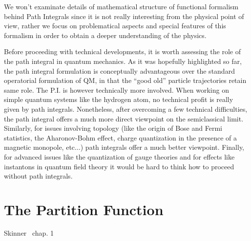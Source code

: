 \documentclass[../main/main.tex]{subfiles}
\begin{document}
We won't examinate details of mathematical structure of functional formalism behind Path Integrals since it is not really interesting from the physical point of view, rather we focus on problematical aspects and special features of this formalism in order to obtain a deeper understanding of the physics. 

Before proceeding with technical developments, it is worth assessing the role of the path integral in quantum mechanics. As it was hopefully highlighted so far, the path integral formulation is conceptually advantageous over the standard operatorial formulation of QM, in that the ``good old'' particle trajectories retain same role. The P.I. is however technically more involved. When working on simple quantum systems like the hydrogen atom, no technical profit is really given by path integrals. Nonetheless, after overcoming a few technical difficulties, the path integral offers a much more direct viewpoint on the semiclassical limit. Similarly, for issues involving topology (like the origin of Bose and Fermi statistics, the Aharonov-Bohm effect, charge quantization in the presence of a magnetic monopole, etc$\dots$) path integrals offer a much better viewpoint. Finally, for advanced issues like the quantization of gauge theories and for effects like instantons in quantum field theory it would be hard to think how to proceed without path integrals.

\section{The Partition Function}
\textsf{Skinner~\cite{Skinner:2018aa} chap. 1}\\
\end{document}
